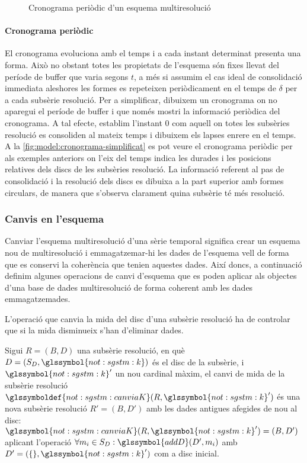 \begin{figure}[tp]
  \centering
  
  \caption{Cronograma periòdic d'un esquema multiresolució}
  \label{fig:model:cronograma-simplificat}
\end{figure}


\paragraph{Cronograma periòdic}
El cronograma evoluciona amb el temps i a cada instant determinat
presenta una forma. Això no obstant totes les propietats de l'esquema
són fixes llevat del període de buffer que varia segons $t$, a més
si assumim el cas ideal de consolidació immediata aleshores les formes
es repeteixen periòdicament en el temps de $\delta$ per a cada
subsèrie resolució.  Per a simplificar, dibuixem un cronograma on no
aparegui el període de buffer i que només mostri la informació
periòdica del cronograma.  A tal efecte, establim l'instant 0 com
aquell on totes les subsèries resolució es consoliden al mateix temps
i dibuixem els lapses enrere en el temps. A la
\autoref{fig:model:cronograma-simplificat} es pot veure el cronograma
periòdic per als exemples anteriors on l'eix del temps  indica
les durades i les posicions relatives dels discs de les subsèries
resolució. La informació referent al pas de consolidació i la
resolució dels discs es dibuixa a la part superior amb formes
circulars, de manera que s'observa clarament quina subsèrie té més
resolució.




\subsubsection{Canvis en l'esquema}


Canviar l'esquema multiresolució d'una sèrie temporal significa crear
un esquema nou de multiresolució i emmagatzemar-hi les dades de
l'esquema vell de forma que es conservi la coherència que tenien
aquestes dades. Així doncs, a continuació definim algunes operacions
de canvi d'esquema que es poden aplicar als objectes d'una base de
dades multiresolució de forma coherent amb les dades emmagatzemades.


L'operació que canvia la mida del disc d'una subsèrie resolució ha de
controlar que si la mida disminueix s'han d'eliminar dades.
\begin{definition}
  Sigui $R=(B,D)$ una subsèrie resolució, en què $D=(S_D,\glssymbol{not:sgstm:k})$ és el
  disc de la subsèrie, i $\glssymbol{not:sgstm:k}'$ un nou cardinal màxim, el canvi de mida
  de la subsèrie resolució $\glssymboldef{not:sgstm:canviaK}(R,\glssymbol{not:sgstm:k}')$ és
  una nova subsèrie resolució $R'=(B,D')$ amb les dades antigues
  afegides de nou al disc: $\glssymbol{not:sgstm:canviaK}(R,\glssymbol{not:sgstm:k}')=
  (B,D')$ aplicant l'operació $\forall m_i \in S_D:
  \glssymbol{addD}(D',m_i)$ amb $D'=(\{\},\glssymbol{not:sgstm:k}')$ com a disc inicial.
\end{definition}


